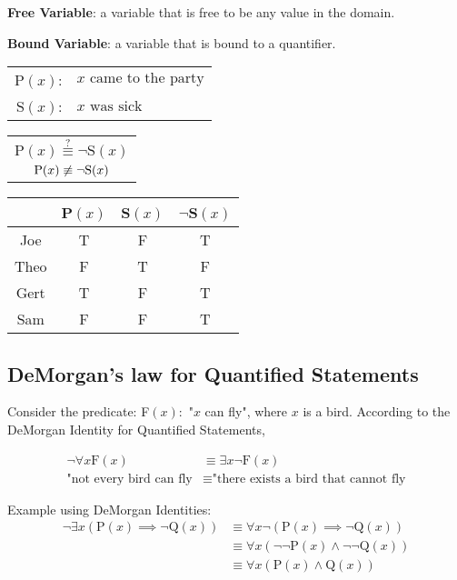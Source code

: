 \noindent \textbf{Free Variable}: a variable that is free to be any value in the domain.

\noindent \textbf{Bound Variable}: a variable that is bound to a quantifier.

\begin{center}
  \begin{tabular}{rl}
    $\text{P}(x)$: & $x \text{ came to the party}$ \\
    $\text{S}(x)$: & $x \text{ was sick}$          \\
  \end{tabular}
  \qquad
  \begin{tabular}{c}
    $\text{P}(x) \overset{?}{\equiv} \lnot \text{S}(x)$ \\
    $\text{P}(x) \centernot{\equiv} \lnot \text{S}(x)$
  \end{tabular}
  \qquad
  \begin{tabular}{c|ccc}
         & P$(x)$ & S$(x)$ & $\lnot$S$(x)$ \\
    \hline
    Joe  & T      & F      & T             \\
    Theo & F      & T      & F             \\
    Gert & T      & F      & T             \\
    Sam  & F      & F      & T
  \end{tabular}
\end{center}

\subsection{DeMorgan's law for Quantified Statements}


Consider the predicate: F$(x):$ "$x$ can fly", where $x$ is a bird.
According to the DeMorgan Identity for Quantified Statements,

\begin{align*}
  \lnot \forall x \text{F}(x)    & \equiv \exists x \lnot \text{F}(x)                 \\
  \text{"not every bird can fly} & \equiv \text{"there exists a bird that cannot fly}
\end{align*}

Example using DeMorgan Identities:
\begin{align*}
  \lnot \exists x (\text{P}(x) \implies \lnot \text{Q}(x)) & \equiv \forall x \lnot (\text{P}(x) \implies \lnot \text{Q}(x))          \\
                                                           & \equiv \forall x (\lnot \lnot \text{P}(x) \land \lnot \lnot \text{Q}(x)) \\
                                                           & \equiv \forall x (\text{P}(x) \land \text{Q}(x))
\end{align*}

